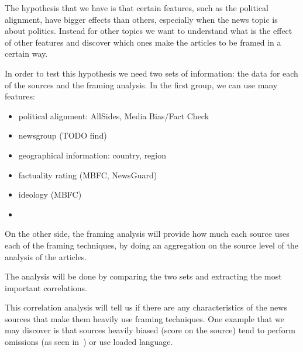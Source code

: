 
The hypothesis that we have is that certain features, such as the political alignment, have bigger effects than others, especially when the news topic is about politics.
Instead for other topics we want to understand what is the effect of other features and discover which ones make the articles to be framed in a certain way.

In order to test this hypothesis we need two sets of information: the data for each of the sources and the framing analysis.
In the first group, we can use many features:

\begin{itemize}
    \item political alignment: AllSides, Media Bias/Fact Check
    \item newsgroup (TODO find)
    \item geographical information: country, region
    \item factuality rating (MBFC, NewsGuard)
    \item ideology (MBFC)
    \item 
\end{itemize}

On the other side, the framing analysis will provide how much each source uses each of the framing techniques, by doing an aggregation on the source level of the analysis of the articles.

The analysis will be done by comparing the two sets and extracting the most important correlations.


This correlation analysis will tell us if there are any characteristics of the news sources that make them heavily use framing techniques.
One example that we may discover is that sources heavily biased (score on the source) tend to perform omissions (as seen in~\citet{bountouridis2018explaining}) or use loaded language.





